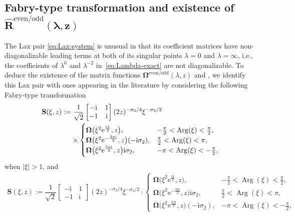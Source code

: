\documentclass[pdftex]{sigma}
\numberwithin{equation}{section}
\newcommand{\ee}{\mathrm{e}}
\newcommand{\ii}{\mathrm{i}}
\renewcommand{\arg}{\operatorname{Arg}}
\begin{document}
\subsection[Fabry-type transformation and existence of Rhateven/odd(lambda,z)]{Fabry-type transformation and existence of $\boldsymbol{\widehat{R}^\mathrm{even/odd}(\lambda,z)}$} \label{sec:suleimanov-solution-connection}
The Lax pair \eqref{eq:Lax-system} is unusual in that its coefficient matrices have non-diagonalizable leading terms at both of its singular points $\lambda = 0$ and $\lambda = \infty$, i.e., the coefficients of $\lambda^0$ and $\lambda^{-2}$ in~\eqref{eq:Lambda-exact} are not diagonalizable. To deduce the existence of the matrix functions ${\mathbf{\Omega}}^{\mathrm{even/odd}}(\lambda, z)$ and , we identify this Lax pair with ones appearing in the literature by considering the following Fabry-type transformation
\begin{align}
&\mathbf{S}(\xi, z) := {\dfrac{1}{\sqrt{2}}} \begin{bmatrix} -\ii & 1\\ -1 &\ii \end{bmatrix} (2z)^{-\sigma_3/4} \xi^{-\sigma_3/2}\nonumber
\\
&\hphantom{\mathbf{S}(\xi, z) :=}{}
\times \begin{cases}
\mathbf \Omega\big(\xi^2 \ee^{\frac{\ii\pi}{2}}, z\big),& -\frac{\pi}{2}<\arg(\xi)<\frac{\pi}{2},\\
\mathbf \Omega\big(\xi^2 \ee^{-\frac{3\pi \ii}{2}}, z\big)(-\ii\sigma_2),& \frac{\pi}{2}<\arg(\xi)<\pi, \\
\mathbf \Omega\big(\xi^2 \ee^{\frac{5\pi \ii}{2}}, z\big)\ii\sigma_2,& -\pi<\arg(\xi)<-\frac{\pi}{2},
 \end{cases}
 \label{eq:fabry-1}
\end{align}
when $|\xi|>1$, and
\begin{gather}
\mathbf{S}(\xi, z) := {\dfrac{1}{\sqrt{2}}} \begin{bmatrix} -\ii & 1\\ -1 &\ii \end{bmatrix} (2z)^{-\sigma_3/4} \xi^{-\sigma_3/2}
\cdot \begin{cases}
\mathbf \Omega\big(\xi^2 \ee^{\frac{\ii\pi}{2}}, z\big),& -\frac{\pi}{2}<\arg(\xi)<\frac{\pi}{2},\\
\mathbf \Omega\big(\xi^2 \ee^{-\frac{3\pi \ii}{2}}, z\big)\ii\sigma_2,& \frac{\pi}{2}<\arg(\xi)<\pi, \\
\mathbf \Omega\big(\xi^2 \ee^{\frac{5\pi \ii}{2}}, z\big)(-\ii\sigma_2),& -\pi<\arg(\xi)<-\frac{\pi}{2},
 \end{cases}\!\!\!\!
 \label{eq:fabry-2}
\end{gather}
\end{document}

